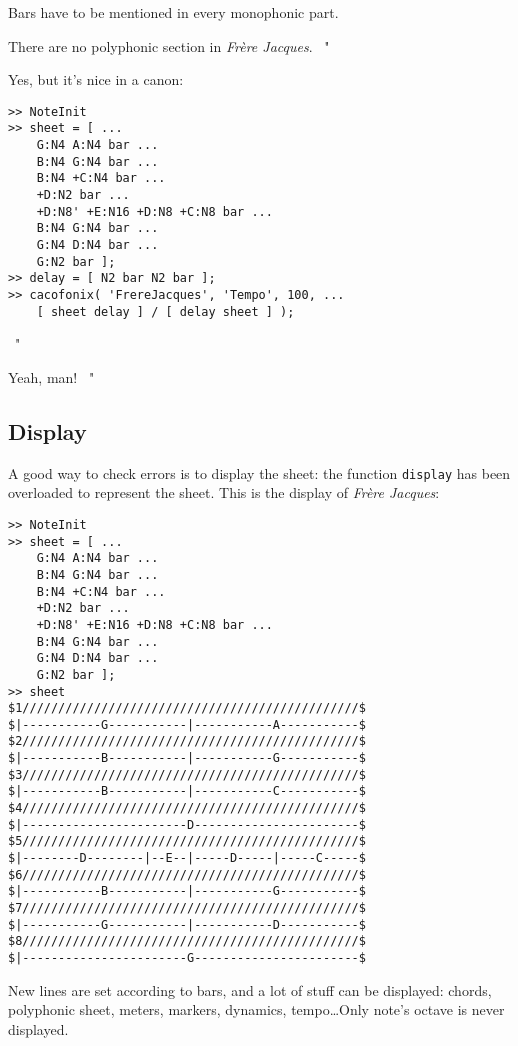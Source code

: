 \documentclass{article}
\newcommand\frerejaques{\emph{Fr\`ere Jacques}\xspace}
\newenvironment{meenv}{ \par \noindent \makebox[6em][r]{ \textcolor{mecolor}{Me}: " --~}}{~"}
\newenvironment{myselfenv}{ \par \noindent \makebox[6em][r]{ \textcolor{myselfcolor}{Myself}: " --~}}{~"}
\newcommand{ \me }[1]{%
\begin{meenv}%
	#1%
\end{meenv} }
\begin{document}
Bars have to be mentioned in every monophonic part.

\me{ There are no polyphonic section in \frerejaques. }
\begin{myselfenv}
Yes, but it's nice in a canon:

\begin{lstlisting}
>> NoteInit
>> sheet = [ ...
	G:N4 A:N4 bar ...
	B:N4 G:N4 bar ...
	B:N4 +C:N4 bar ...
	+D:N2 bar ...
	+D:N8' +E:N16 +D:N8 +C:N8 bar ...
	B:N4 G:N4 bar ...
	G:N4 D:N4 bar ...
	G:N2 bar ];
>> delay = [ N2 bar N2 bar ];
>> cacofonix( 'FrereJacques', 'Tempo', 100, ...
	[ sheet delay ] / [ delay sheet ] );
\end{lstlisting}

\end{myselfenv}
\me{ Yeah, man! }

\subsection{Display}

A good way to check errors is to display the sheet: the function \lstinline!display! has been overloaded to represent the sheet. This is the display of \frerejaques:
\begin{lstlisting}
>> NoteInit
>> sheet = [ ...
	G:N4 A:N4 bar ...
	B:N4 G:N4 bar ...
	B:N4 +C:N4 bar ...
	+D:N2 bar ...
	+D:N8' +E:N16 +D:N8 +C:N8 bar ...
	B:N4 G:N4 bar ...
	G:N4 D:N4 bar ...
	G:N2 bar ];
>> sheet
$1///////////////////////////////////////////////$
$|-----------G-----------|-----------A-----------$
$2///////////////////////////////////////////////$
$|-----------B-----------|-----------G-----------$
$3///////////////////////////////////////////////$
$|-----------B-----------|-----------C-----------$
$4///////////////////////////////////////////////$
$|-----------------------D-----------------------$
$5///////////////////////////////////////////////$
$|--------D--------|--E--|-----D-----|-----C-----$
$6///////////////////////////////////////////////$
$|-----------B-----------|-----------G-----------$
$7///////////////////////////////////////////////$
$|-----------G-----------|-----------D-----------$
$8///////////////////////////////////////////////$
$|-----------------------G-----------------------$
\end{lstlisting}

New lines are set according to bars, and a lot of stuff can be displayed: chords, polyphonic sheet, meters, markers, dynamics, tempo\dots Only note's octave is never displayed.
\end{document}
